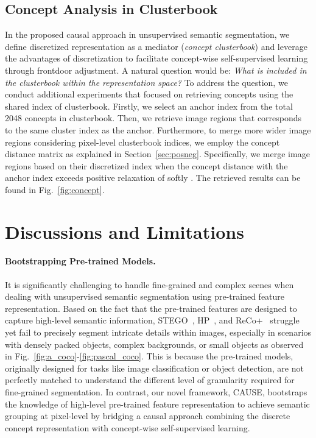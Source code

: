 \documentclass{article} \usepackage{iclr2024_conference,times}
\begin{document}
\subsection{Concept Analysis in Clusterbook}
In the proposed causal approach in unsupervised semantic segmentation, we define discretized representation as a mediator (\textit{concept clusterbook}) and leverage the advantages of discretization to facilitate concept-wise self-supervised learning through frontdoor adjustment. A natural question would be: \textit{What is included in the clusterbook within the representation space?} To address the question, we conduct additional experiments that focused on retrieving concepts using the shared index of clusterbook. Firstly, we select an anchor index from the total 2048 concepts in clusterbook. Then, we retrieve image regions that corresponds to the same cluster index as the anchor. Furthermore, to merge more wider image regions considering pixel-level clusterbook indices, we employ the concept distance matrix as explained in Section~\ref{sec:posneg}. Specifically, we merge image regions based on their discretized index when the concept distance with the anchor index exceeds positive relaxation of softly . The retrieved results can be found in Fig.~\ref{fig:concept}.



\section{Discussions and Limitations}
\label{appendix:D}
\paragraph{Bootstrapping Pre-trained Models.} It is significantly challenging to handle fine-grained and complex scenes when dealing with unsupervised semantic segmentation using pre-trained feature representation. Based on the fact that the pre-trained features are designed to capture high-level semantic information, STEGO~\citep{hamilton2022unsupervised}, HP~\citep{seong2023leveraging}, and ReCo+~\citep{shin2022reco} struggle yet fail to precisely segment intricate details within images, especially in scenarios with densely packed objects, complex backgrounds, or small objects as observed in Fig.~\ref{fig:a_coco}-\ref{fig:pascal_coco}. 
This is because the pre-trained models, originally designed for tasks like image classification or object detection, are not perfectly matched to understand the different level of granularity required for fine-grained segmentation. In contrast, our novel framework, CAUSE, bootstraps the knowledge of high-level pre-trained feature representation to achieve semantic grouping at pixel-level by bridging a causal approach combining the discrete concept representation with concept-wise self-supervised learning.
\end{document}
